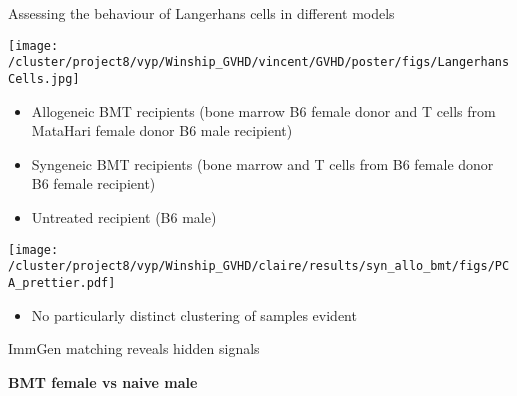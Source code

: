 \documentclass[final,hyperref={pdfpagelabels=false}]{beamer}
\begin{document}
\begin{frame}{}
\begin{columns}[t]
\begin{column}{.36\linewidth}
\begin{block}{Assessing the behaviour of Langerhans cells in different models}
    \begin{center}
      \texttt{[image: /cluster/project8/vyp/Winship\_GVHD/vincent/GVHD/poster/figs/LangerhansCells.jpg]}
    \end{center}
    \begin{itemize}
    \item Allogeneic BMT recipients (bone marrow B6 female donor and T cells from MataHari female donor B6 male recipient)
    \item Syngeneic BMT recipients (bone marrow and T cells from B6 female donor  B6 female recipient)
    \item Untreated recipient (B6 male)
    \end{itemize}

	\begin{minipage}{0.6\textwidth}
	  \texttt{[image: /cluster/project8/vyp/Winship\_GVHD/claire/results/syn\_allo\_bmt/figs/PCA\_prettier.pdf]}
	\end{minipage}
	\begin{minipage}{0.3\textwidth}
	  {\small             \begin{itemize}
    \item No particularly distinct clustering of samples evident
          \end{itemize}}
	\end{minipage}
  \end{block}
\vspace{3cm}

\begin{block}{ImmGen matching reveals hidden signals}

  {\bf BMT female vs naive male}


\end{block}
\end{column}
\end{columns}
\end{frame}
\end{document}
